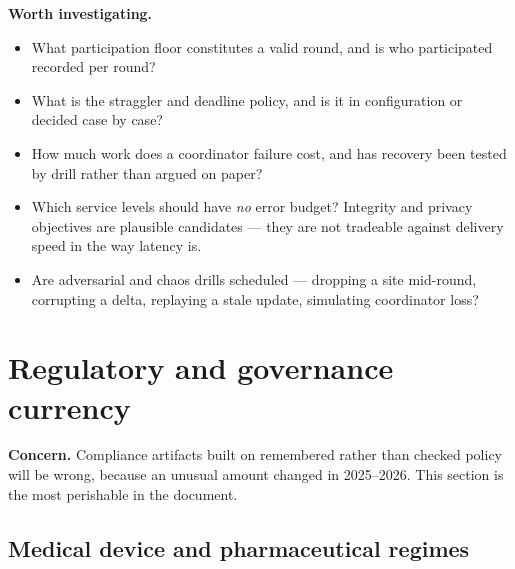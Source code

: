 \documentclass[11pt,a4paper]{article}
\newcommand{\concern}[1]{\par\medskip\noindent\textbf{Concern.} #1}
\newcommand{\investigate}{\par\smallskip\noindent\textbf{Worth investigating.}}
\begin{document}
\investigate
\begin{itemize}
  \item What participation floor constitutes a valid round, and is who
  participated recorded per round?
  \item What is the straggler and deadline policy, and is it in
  configuration or decided case by case?
  \item How much work does a coordinator failure cost, and has recovery been
  tested by drill rather than argued on paper?
  \item Which service levels should have \emph{no} error budget? Integrity
  and privacy objectives are plausible candidates --- they are not
  tradeable against delivery speed in the way latency is.
  \item Are adversarial and chaos drills scheduled --- dropping a site
  mid-round, corrupting a delta, replaying a stale update, simulating
  coordinator loss?
\end{itemize}

\section{Regulatory and governance currency}
\label{sec:regulatory}

\concern{Compliance artifacts built on remembered rather than checked policy
will be wrong, because an unusual amount changed in 2025--2026. This section
is the most perishable in the document.}

\subsection{Medical device and pharmaceutical regimes}
\end{document}
